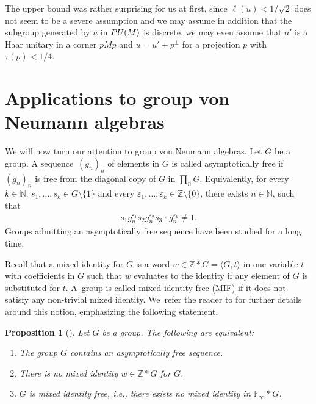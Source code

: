 \documentclass[11pt]{article}
\numberwithin{equation}{section}
\numberwithin{equation}{section}
\newtheorem{Proposition}[Theorem]{Proposition}
 { \theoremstyle{definition}
\newtheorem{Definition}[Theorem]{Definition}
\newtheorem{Note}[Theorem]{Note}
\newtheorem{Example}[Theorem]{Example}
\newtheorem{Remark}[Theorem]{Remark}
\newtheorem{Question}[Theorem]{Question} }
\begin{document}
The upper bound was rather surprising for us at first, since $\ell(u)< 1/\sqrt{2}$ does not seem to be a severe assumption and we may assume in addition that the subgroup generated by $u$ in ${\rm PU}(M)$ is discrete, we may even assume that $u'$ is a Haar unitary in a corner $pMp$ and $u = u' + p^{\perp}$ for a projection $p$ with $\tau(p)<1/4$.



\section{Applications to group von Neumann algebras}

We will now turn our attention to group von Neumann algebras. Let $G$ be a group. A sequ\-ence~$(g_n)_n$ of elements in $G$ is called asymptotically free if $(g_n)_n$ is free from the diagonal copy of $G$ in $\prod_n G$. Equivalently, for every $k \in \mathbb N$, $s_1,\dots,s_k \in G \setminus \{1\}$ and every $\varepsilon_1,\dots,\varepsilon_k \in \mathbb Z \setminus \{0\}$, there exists $n \in \mathbb N$, such that
\begin{gather*}
s_1 g_n^{\varepsilon_1} s_2 g_n^{\varepsilon_2} s_3 \cdots g_n^{\varepsilon_k} \neq 1.
\end{gather*}
Groups admitting an asymptotically free sequence have been studied for a long time.

Recall that a mixed identity for $G$ is a word $w \in \mathbb Z \ast G = \langle G, t\rangle$ in one variable $t$ with coefficients in $G$ such that $w$ evaluates to the identity if any element of $G$ is substituted for $t$. A~group is called mixed identity free (MIF) if it does not satisfy any non-trivial mixed identity. We~refer the reader to \cite{MR3556970} for further details around this notion, emphasizing the following statement.

\begin{Proposition}[{\cite[proof of Proposition 5.3 and Remark 5.1]{MR3556970}}]
Let $G$ be a group. The following are equivalent:
\begin{enumerate}\itemsep=0pt
\item[$1.$] The group $G$ contains an asymptotically free sequence.
\item[$2.$] There is no mixed identity $w \in \mathbb Z \ast G$ for $G$.
\item[$3.$] $G$ is mixed identity free, i.e., there exists no mixed identity in $\mathbb F_\infty \ast G$.
\end{enumerate}
\end{Proposition}
\end{document}
